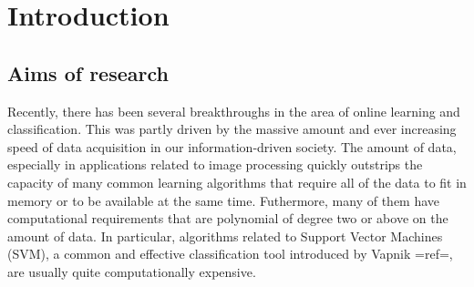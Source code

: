 

\chapter{Introduction}

\ifpdf
    \graphicspath{{1_introduction/figures/PNG/}{1_introduction/figures/PDF/}{1_introduction/figures/}}
\else
    \graphicspath{{1_introduction/figures/EPS/}{1_introduction/figures/}}
\fi







\section{Aims of research} %
Recently, there has been several breakthroughs in the area of online learning and classification. This was partly driven by the massive amount and ever increasing speed of data acquisition in our information-driven society. The amount of data, especially in applications related to image processing quickly outstrips the capacity of many common learning algorithms that require all of the data to fit in memory or to be available at the same time. Futhermore, many of them have computational requirements that are polynomial of degree two or above on the amount of data. In particular, algorithms related to Support Vector Machines (SVM), a common and effective classification tool introduced by Vapnik {{=ref=}}, are usually quite computationally expensive.

